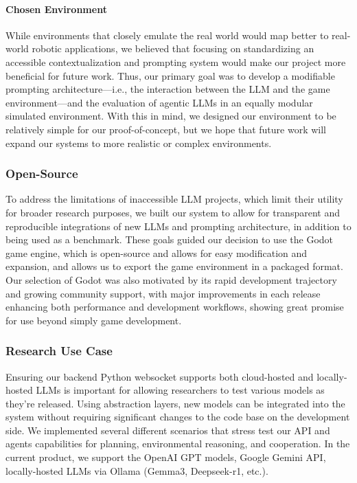 \documentclass{article}
\begin{document}
\paragraph{Chosen Environment} While environments that closely emulate the real world would map better to real-world robotic applications, we believed that focusing on standardizing an accessible contextualization and prompting system would make our project more beneficial for future work.
Thus, our primary goal was to develop a modifiable prompting architecture---i.e., the interaction between the LLM and the game environment---and the evaluation of agentic LLMs in an equally modular simulated environment.
With this in mind, we designed our environment to be relatively simple for our proof-of-concept, but we hope that future work will expand our systems to more realistic or complex environments.

\subsubsection{Open-Source}
To address the limitations of inaccessible LLM projects, which limit their utility for broader research purposes, we built our system to allow for transparent and reproducible integrations of new LLMs and prompting architecture, in addition to being used as a benchmark.
These goals guided our decision to use the Godot game engine, which is open-source and allows for easy modification and expansion, and allows us to export the game environment in a packaged format.
Our selection of Godot was also motivated by its rapid development trajectory and growing community support, with major improvements in each release enhancing both performance and development workflows, showing great promise for use beyond simply game development.

\subsubsection{Research Use Case}
Ensuring our backend Python websocket supports both cloud-hosted and locally-hosted LLMs is important for allowing researchers to test various models as they're released.
Using abstraction layers, new models can be integrated into the system without requiring significant changes to the code base on the development side.
We implemented several different scenarios that stress test our API and agents capabilities for planning, environmental reasoning, and cooperation.
In the current product, we support the OpenAI GPT models, Google Gemini API, locally-hosted LLMs via Ollama (Gemma3, Deepseek-r1, etc.).
\end{document}
